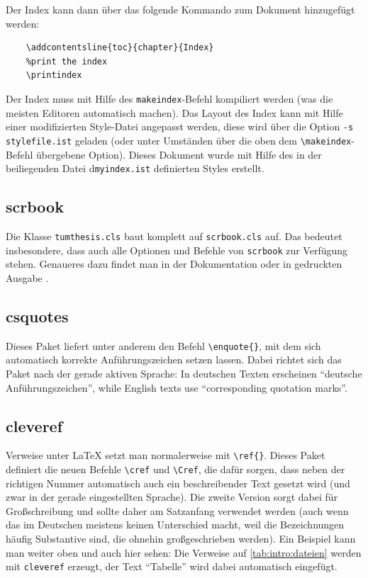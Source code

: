 Der Index kann dann über das folgende Kommando zum Dokument hinzugefügt werden:

\begin{lstlisting}[language={[LaTex]TeX}]
	%Add the index to the table of contents
	\addcontentsline{toc}{chapter}{Index}
	%print the index
	\printindex
\end{lstlisting}
Der Index muss mit Hilfe des \verb|makeindex|-Befehl kompiliert werden (was die meisten Editoren automatisch machen). Das Layout des Index kann mit Hilfe einer modifizierten Style-Datei angepasst werden, diese wird über die Option \verb|-s stylefile.ist| geladen (oder unter Umständen über die oben dem \verb|\makeindex|-Befehl übergebene Option). Dieses Dokument wurde mit Hilfe des in der beiliegenden Datei d\verb|myindex.ist| definierten Styles erstellt.

\subsection{scrbook}
\label{sec:intro:scrbook}
Die Klasse \texttt{tumthesis.cls} baut komplett auf \texttt{scrbook.cls}
auf. Das bedeutet insbesondere, dass auch alle Optionen und Befehle von
\texttt{scrbook} zur Verfügung stehen. Genaueres dazu findet man in der
Dokumentation \cite{KohmMorawski2012} oder in gedruckten Ausgabe
\textcite{KohmMorawski2012b}.

\subsection{csquotes}
\label{sec:intro:csquotes}
Dieses Paket liefert unter anderem den Befehl \verb|\enquote{}|, mit dem sich
automatisch korrekte Anführungszeichen setzen lassen. Dabei richtet sich das
Paket nach der gerade aktiven Sprache: In deutschen Texten erscheinen
\enquote{deutsche Anführungszeichen},  while English
texts use \enquote{corresponding quotation marks}. 

\subsection{cleveref}
\label{sec:intro:cleveref}
Verweise unter \LaTeX{} setzt man normalerweise mit \verb|\ref{}|. Dieses Paket
definiert die neuen Befehle \verb|\cref| und \verb|\Cref|, die dafür sorgen,
dass neben der richtigen Nummer automatisch auch ein beschreibender Text gesetzt
wird (und zwar in der gerade eingestellten Sprache). Die zweite Version sorgt
dabei für Großschreibung und sollte daher am Satzanfang verwendet werden (auch
wenn das im Deutschen meistens keinen Unterschied macht, weil die Bezeichnungen
häufig Substantive sind, die ohnehin großgeschrieben werden). Ein Beispiel kann
man weiter oben und auch hier sehen: Die Verweise auf \cref{tab:intro:dateien}
werden mit \texttt{cleveref} erzeugt, der Text \enquote{Tabelle} wird dabei
automatisch eingefügt.


